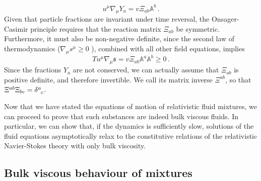 \documentclass[a4paper, amsfonts, amssymb, amsmath, reprint, showkeys, nofootinbib, twoside, onecolumn,notitlepage]{revtex4-1}
\begin{document}
\begin{equation}\label{uY}
u^\mu \nabla_\mu Y_a = v \Xi_{ab}\mathbb{A}^b \, .
\end{equation}
Given that particle fractions are invariant under time reversal, the Onsager-Casimir principle \cite{Onsager_Casimir,GavassinoCasmir2022} requires that the reaction matrix $\Xi_{ab}$ be symmetric. Furthermore, it must also be non-negative definite, since the second law of thermodynamics ($\nabla_\mu s^\mu \geq 0$ \cite{Israel_2009_inbook}), combined with all other field equations, implies
\begin{equation}\label{us}
T u^\mu \nabla_\mu \mathfrak{s} = v\Xi_{ab}\mathbb{A}^a\mathbb{A}^b \geq 0 \, .
\end{equation} 
Since the fractions $Y_a$ are not conserved, we can actually assume that $\Xi_{ab}$ is positive definite, and therefore invertible. We call its matrix inverse $\Xi^{ab}$, so that $\Xi^{ab}\Xi_{bc}= \delta\indices{^a _c}$.

Now that we have stated the equations of motion of  relativistic fluid mixtures, we can proceed to prove that such substances are indeed bulk viscous fluids. In particular, we can show that, if the dynamics is sufficiently slow, solutions of the fluid equations asymptotically relax \cite{Geroch1995} to the constitutive relations of the relativistic Navier-Stokes theory \cite{Eckart40} with only bulk viscosity.

\subsection{Bulk viscous behaviour of mixtures}\label{dinamo2}
\end{document}

